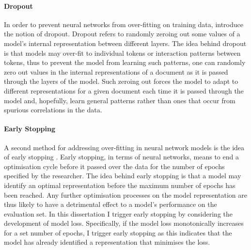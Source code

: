 \paragraph*{Dropout} In order to prevent neural networks from over-fitting on training data, \citet{Goldberg:2017} introduce the notion of dropout. Dropout refers to randomly zeroing out some values of a model's internal representation between different layers. The idea behind dropout is that models may over-fit to individual tokens or interaction patterns between tokens, thus to prevent the model from learning such patterns, one can randomly zero out values in the internal representations of a document as it is passed through the layers of the model.
Such zeroing out forces the model to adapt to different representations for a given document each time it is passed through the model and, hopefully, learn general patterns rather than ones that occur from spurious correlations in the data.

\paragraph*{Early Stopping} A second method for addressing over-fitting in neural network models is the idea of early stopping \citep{Prechelt:1998}. Early stopping, in terms of neural networks, means to end a optimisation cycle before it passed over the data for the number of epochs specified by the researcher. The idea behind early stopping is that a model may identify an optimal representation before the maximum number of epochs has been reached. Any further optimisation processes on the model representation are thus likely to have a detrimental effect to a model's performance on the evaluation set.
In this dissertation I trigger early stopping by considering the development of model loss. Specifically, if the model loss monotonically increases for a set number of epochs, I trigger early stopping as this indicates that the model has already identified a representation that minimises the loss.

%
%
